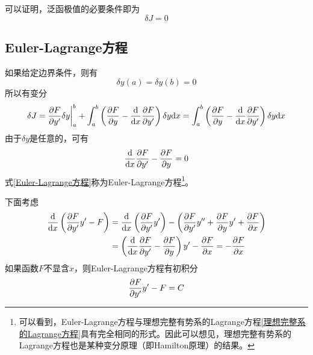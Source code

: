 可以证明，泛函极值的必要条件即为
\begin{equation}
	\delta J = 0
\end{equation}

\subsection{Euler-Lagrange方程}

如果给定边界条件，则有
\begin{equation}
	\delta y(a) = \delta y(b) = 0
	\label{变分问题边界条件}
\end{equation}
所以有变分
\begin{equation*}
	\delta J = \frac{\partial F}{\partial y'} \delta y \bigg|_a^b + \int_a^b \left(\frac{\partial F}{\partial y} - \frac{\mathrm{d}}{\mathrm{d} x} \frac{\partial F}{\partial y'}\right) \delta y \mathrm{d} x = \int_a^b \left(\frac{\partial F}{\partial y} - \frac{\mathrm{d}}{\mathrm{d} x} \frac{\partial F}{\partial y'}\right) \delta y \mathrm{d} x
\end{equation*}
由于$\delta y$是任意的，可有
\begin{equation}
	\frac{\mathrm{d}}{\mathrm{d} x} \frac{\partial F}{\partial y'} - \frac{\partial F}{\partial y} = 0
	\label{Euler-Lagrange方程}
\end{equation}
式\eqref{Euler-Lagrange方程}称为{\heiti Euler-Lagrange方程}\footnote{可以看到，Euler-Lagrange方程与理想完整有势系的Lagrange方程\eqref{理想完整系的Lagrange方程}具有完全相同的形式。因此可以想见，理想完整有势系的Lagrange方程也是某种变分原理（即{\heiti Hamilton原理}）的结果。}。

下面考虑
\begin{align*}
	\frac{\mathrm{d}}{\mathrm{d} x} \left(\frac{\partial F}{\partial y'} y' - F\right) & = \frac{\mathrm{d}}{\mathrm{d} x} \left(\frac{\partial F}{\partial y'}y'\right) - \left(\frac{\partial F}{\partial y'} y'' + \frac{\partial F}{\partial y} y' + \frac{\partial F}{\partial x}\right) \\
	& = \left(\frac{\mathrm{d}}{\mathrm{d} x} \frac{\partial F}{\partial y'} - \frac{\partial F}{\partial y}\right) y' - \frac{\partial F}{\partial x} = -\frac{\partial F}{\partial x}
\end{align*}
如果函数$F$不显含$x$，则Euler-Lagrange方程有初积分
\begin{equation}
	\frac{\partial F}{\partial y'}y' - F = C
\end{equation}

